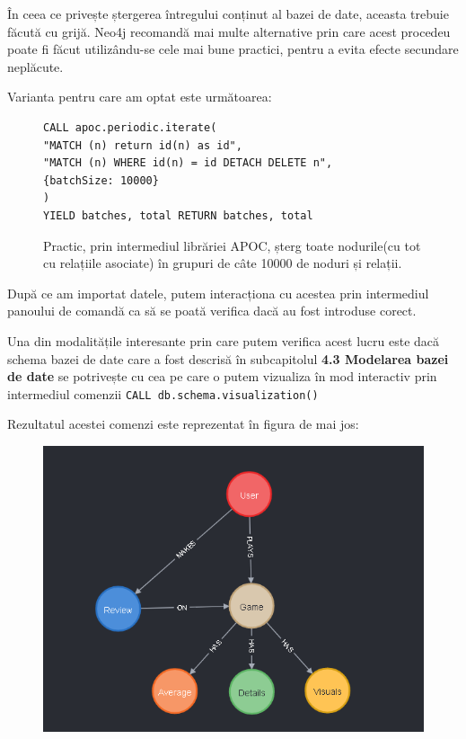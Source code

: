 \documentclass[12pt,a4paper]{report}
\begin{document}
\newpage

În ceea ce privește ștergerea întregului conținut al bazei de date, aceasta trebuie făcută cu grijă. Neo4j recomandă mai multe alternative prin care acest procedeu poate fi făcut utilizându-se cele mai bune practici, pentru a evita efecte secundare neplăcute. \cite{19}

Varianta pentru care am optat este următoarea:

\begin{figure}[H]
\centering
\begin{BVerbatim}
CALL apoc.periodic.iterate(
"MATCH (n) return id(n) as id",
"MATCH (n) WHERE id(n) = id DETACH DELETE n", 
{batchSize: 10000}
)
YIELD batches, total RETURN batches, total
\end{BVerbatim}
\caption*{Practic, prin intermediul librăriei APOC, șterg toate nodurile(cu tot cu relațiile asociate) în grupuri de câte 10000 de noduri și relații.}
\end{figure}

După ce am importat datele, putem interacționa cu acestea prin intermediul panoului de comandă ca să se poată verifica dacă au fost introduse corect.

Una din modalitățile interesante prin care putem verifica acest lucru este dacă schema bazei de date care a fost descrisă în subcapitolul \textbf{4.3 Modelarea bazei de date } se potrivește cu cea pe care o putem vizualiza în mod interactiv prin intermediul comenzii \texttt{CALL db.schema.visualization()}

Rezultatul acestei comenzi este reprezentat în figura de mai jos:

\begin{figure}[H]
\centering
\caption{}
\includegraphics[scale = 0.7]{exemplu_16_schema}
\caption*{}
\end{figure}
\end{document}
